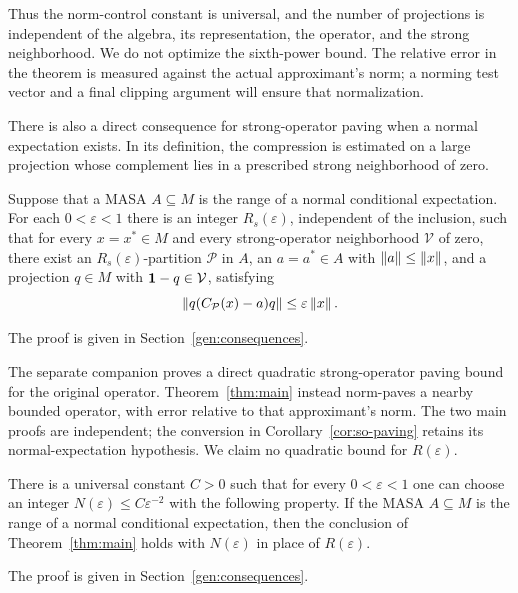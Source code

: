 Thus the norm-control constant is universal, and the number of
projections is independent of the algebra, its representation, the
operator, and the strong neighborhood. We do not optimize the
sixth-power bound.
The relative error in the theorem is measured against the actual
approximant's norm; a norming test vector and a final clipping argument
will ensure that normalization.

There is also a direct consequence for strong-operator paving when a
normal expectation exists. In its definition, the compression is
estimated on a large projection whose complement lies in a prescribed
strong neighborhood of zero.

\begin{corollary}\label{cor:so-paving}
Suppose that a MASA \(A\subseteq M\) is the range of a normal
conditional expectation. For each \(0<\varepsilon<1\) there is an
integer \(R_s(\varepsilon)\), independent of the inclusion, such that
for every \(x=x^*\in M\) and every strong-operator neighborhood
\(\mathcal V\) of zero, there exist an \(R_s(\varepsilon)\)-partition
\(\mathcal P\) in \(A\), an \(a=a^*\in A\) with
\(\left\lVert a\right\rVert\leq\left\lVert x\right\rVert\), and a projection \(q\in M\) with
\(\mathbf 1-q\in\mathcal V\), satisfying
\[
 \left\lVert q(C_{\mathcal P}(x)-a)q\right\rVert\leq\varepsilon\left\lVert x\right\rVert.
\]
\end{corollary}
The proof is given in Section~\ref{gen:consequences}.

The separate companion \cite[Theorem~1.1]{OAQuadratic26} proves a direct
quadratic strong-operator paving bound for the original operator.
Theorem~\ref{thm:main} instead norm-paves a nearby bounded operator,
with error relative to that approximant's norm. The two main proofs are
independent; the conversion in Corollary~\ref{cor:so-paving} retains its normal-expectation
hypothesis. We claim no quadratic bound for \(R(\varepsilon)\).

\begin{corollary}
\label{cor:quadratic-expected-approximation}
There is a universal constant \(C>0\) such that for every
\(0<\varepsilon<1\) one can choose an integer
\(N(\varepsilon)\leq C\varepsilon^{-2}\) with the following property.
If the MASA \(A\subseteq M\) is the range of a normal conditional expectation,
then the conclusion of Theorem~\ref{thm:main} holds with
\(N(\varepsilon)\) in place of \(R(\varepsilon)\).
\end{corollary}
The proof is given in Section~\ref{gen:consequences}.

